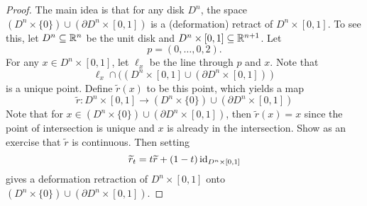 \begin{proof}
  The main idea is that for any disk $D^n$, the space
  $(D^n \times \{0\}) \cup (\partial D^n \times [0, 1])$
  is a (deformation) retract of $D^n \times [0, 1]$.
  To see this, let $D^n \subseteq \mathbb{R}^n$ be the unit
  disk and $D^n \times [0, 1] \subseteq \mathbb{R}^{n + 1}$.
  Let
  \[
    p = (0, \dots, 0, 2).
  \]
  For any $x \in D^n \times [0, 1]$, let
  $\ell_x$ be the line through $p$ and $x$. Note that
  \[
    \ell_x \cap ((D^n \times [0, 1] \cup (\partial D^n \times [0, 1]))
  \]
  is a unique point. Define $\widetilde{r}(x)$ to be this point,
  which yields a map
  \[\widetilde{r} : D^n \times [0, 1] \to (D^n \times \{0\}) \cup (\partial D^n \times [0, 1])\]
  Note that for $x \in (D^n \times \{0\}) \cup (\partial D^n \times [0, 1])$,
  then $\widetilde{r}(x) = x$ since the point of intersection is
  unique and $x$ is already in the intersection.
  Show as an exercise that $\widetilde{r}$ is continuous.
  Then setting
  \[
    \widetilde{r}_t = t \widetilde{r} + (1 - t) \operatorname{id}_{D^n \times [0, 1]}
  \]
  gives a deformation retraction
  of $D^n \times [0, 1]$ onto
  $(D^n \times \{0\}) \cup (\partial D^n \times [0, 1])$.


\end{proof}
